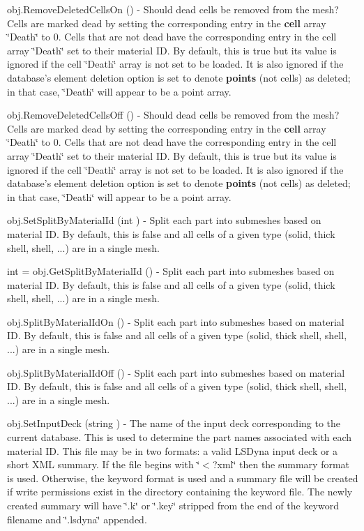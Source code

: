 \begin{DoxyItemize}
\item {\ttfamily obj.\-Remove\-Deleted\-Cells\-On ()} -\/ Should dead cells be removed from the mesh? Cells are marked dead by setting the corresponding entry in the {\bfseries cell} array \char`\"{}\-Death\char`\"{} to 0. Cells that are not dead have the corresponding entry in the cell array \char`\"{}\-Death\char`\"{} set to their material I\-D. By default, this is true but its value is ignored if the cell \char`\"{}\-Death\char`\"{} array is not set to be loaded. It is also ignored if the database's element deletion option is set to denote {\bfseries points} (not cells) as deleted; in that case, \char`\"{}\-Death\char`\"{} will appear to be a point array.  
\item {\ttfamily obj.\-Remove\-Deleted\-Cells\-Off ()} -\/ Should dead cells be removed from the mesh? Cells are marked dead by setting the corresponding entry in the {\bfseries cell} array \char`\"{}\-Death\char`\"{} to 0. Cells that are not dead have the corresponding entry in the cell array \char`\"{}\-Death\char`\"{} set to their material I\-D. By default, this is true but its value is ignored if the cell \char`\"{}\-Death\char`\"{} array is not set to be loaded. It is also ignored if the database's element deletion option is set to denote {\bfseries points} (not cells) as deleted; in that case, \char`\"{}\-Death\char`\"{} will appear to be a point array.  
\item {\ttfamily obj.\-Set\-Split\-By\-Material\-Id (int )} -\/ Split each part into submeshes based on material I\-D. By default, this is false and all cells of a given type (solid, thick shell, shell, ...) are in a single mesh.  
\item {\ttfamily int = obj.\-Get\-Split\-By\-Material\-Id ()} -\/ Split each part into submeshes based on material I\-D. By default, this is false and all cells of a given type (solid, thick shell, shell, ...) are in a single mesh.  
\item {\ttfamily obj.\-Split\-By\-Material\-Id\-On ()} -\/ Split each part into submeshes based on material I\-D. By default, this is false and all cells of a given type (solid, thick shell, shell, ...) are in a single mesh.  
\item {\ttfamily obj.\-Split\-By\-Material\-Id\-Off ()} -\/ Split each part into submeshes based on material I\-D. By default, this is false and all cells of a given type (solid, thick shell, shell, ...) are in a single mesh.  
\item {\ttfamily obj.\-Set\-Input\-Deck (string )} -\/ The name of the input deck corresponding to the current database. This is used to determine the part names associated with each material I\-D. This file may be in two formats\-: a valid L\-S\-Dyna input deck or a short X\-M\-L summary. If the file begins with \char`\"{}$<$?xml\char`\"{} then the summary format is used. Otherwise, the keyword format is used and a summary file will be created if write permissions exist in the directory containing the keyword file. The newly created summary will have \char`\"{}.\-k\char`\"{} or \char`\"{}.\-key\char`\"{} stripped from the end of the keyword filename and \char`\"{}.\-lsdyna\char`\"{} appended.  

\end{DoxyItemize}

